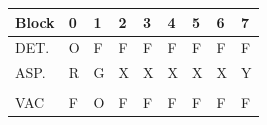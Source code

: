 \documentclass[a4paper,12pt]{article}
\begin{document}
\begin{table}[htp]
\centering
\begin{tabular}{lllllllll}
\hline
\multicolumn{1}{|l|}{Block} & \multicolumn{1}{l|}{0}                         & \multicolumn{1}{l|}{1}                         & \multicolumn{1}{l|}{2}                         & \multicolumn{1}{l|}{3}                         & \multicolumn{1}{l|}{4}                         & \multicolumn{1}{l|}{5}                         & \multicolumn{1}{l|}{6}                                                & \multicolumn{1}{l|}{7}                                                \\ \hline
\multicolumn{1}{|l|}{DET.}  & \multicolumn{1}{l|}{\cellcolor[HTML]{FD6864}O} & \multicolumn{1}{l|}{\cellcolor[HTML]{32CB00}F} & \multicolumn{1}{l|}{\cellcolor[HTML]{32CB00}F} & \multicolumn{1}{l|}{\cellcolor[HTML]{32CB00}F} & \multicolumn{1}{l|}{\cellcolor[HTML]{32CB00}F} & \multicolumn{1}{l|}{\cellcolor[HTML]{32CB00}F} & \multicolumn{1}{l|}{\cellcolor[HTML]{32CB00}F}                        & \multicolumn{1}{l|}{\cellcolor[HTML]{32CB00}F}                        \\ \hline
\multicolumn{1}{|l|}{ASP.}  & \multicolumn{1}{l|}{\cellcolor[HTML]{FE0000}R} & \multicolumn{1}{l|}{\cellcolor[HTML]{009901}G} & \multicolumn{1}{l|}{X}                         & \multicolumn{1}{l|}{X}                         & \multicolumn{1}{l|}{X}                         & \multicolumn{1}{l|}{X}                         & \multicolumn{1}{l|}{X}                                                & \multicolumn{1}{l|}{\cellcolor[HTML]{F8FF00}Y}                        \\ \hline
                            &                                                &                                                &                                                &                                                &                                                &                                                &                                                                       &                                                                       \\ \hline
\multicolumn{1}{|l|}{VAC}   & \multicolumn{1}{l|}{\cellcolor[HTML]{32CB00}F} & \multicolumn{1}{l|}{\cellcolor[HTML]{FD6864}O} & \multicolumn{1}{l|}{\cellcolor[HTML]{32CB00}F} & \multicolumn{1}{l|}{\cellcolor[HTML]{32CB00}F} & \multicolumn{1}{l|}{\cellcolor[HTML]{32CB00}F} & \multicolumn{1}{l|}{\cellcolor[HTML]{32CB00}F} & \multicolumn{1}{l|}{\cellcolor[HTML]{32CB00}F}                        & \multicolumn{1}{l|}{\cellcolor[HTML]{32CB00}F}                        \\ \hline

\end{tabular}
\end{table}
\end{document}
